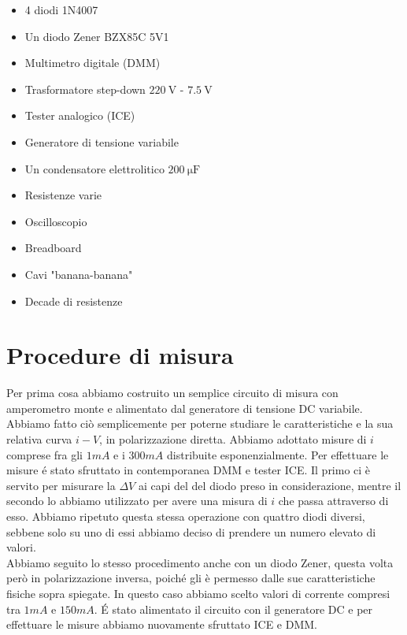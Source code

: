 \documentclass{article}
\begin{document}
\begin{itemize}
  \item 4 diodi 1N4007
  \item Un diodo Zener BZX85C 5V1 
  \item Multimetro digitale (DMM)
  \item Trasformatore step-down $\SI{220}{\volt}$ - $\SI{7.5}{\volt}$
  \item Tester analogico (ICE)
  \item Generatore di tensione variabile
  \item Un condensatore elettrolitico $\SI{200}{\micro\farad}$
  \item Resistenze varie
  \item Oscilloscopio
  \item Breadboard
  \item Cavi "banana-banana"
  \item Decade di resistenze
\end{itemize}

\section{Procedure di misura}

Per prima cosa abbiamo costruito un semplice circuito di misura con amperometro monte e alimentato dal generatore di tensione DC variabile. Abbiamo fatto ciò semplicemente per poterne studiare le caratteristiche e la sua relativa curva $i-V$, in polarizzazione diretta. Abbiamo adottato misure di $i$ comprese fra gli $1mA$ e i $300mA$ distribuite esponenzialmente. Per effettuare le misure \'e stato sfruttato in contemporanea DMM e tester ICE. Il primo ci è servito per misurare la $\Delta V$ ai capi del del diodo preso in considerazione, mentre il secondo lo abbiamo utilizzato per avere una misura di $i$ che passa attraverso di esso. Abbiamo ripetuto questa stessa operazione con quattro diodi diversi, sebbene solo su uno di essi abbiamo deciso di prendere un numero elevato di valori. \\

Abbiamo seguito lo stesso procedimento anche con un diodo Zener, questa volta però in polarizzazione inversa, poiché gli è permesso dalle sue caratteristiche fisiche sopra spiegate. In questo caso abbiamo scelto valori di corrente compresi tra $1mA$ e $150mA$. \'E stato alimentato il circuito con il generatore DC e per effettuare le misure abbiamo nuovamente sfruttato ICE e DMM. \\
\end{document}
